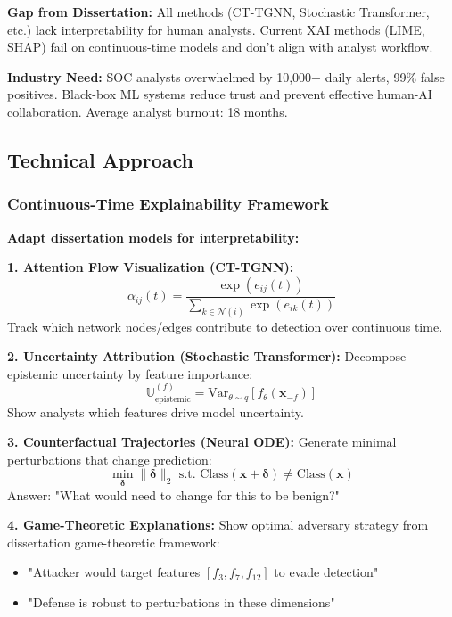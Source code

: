 \documentclass[11pt,letterpaper]{article}
\begin{document}
\textbf{Gap from Dissertation:} All methods (CT-TGNN, Stochastic Transformer, etc.) lack interpretability for human analysts. Current XAI methods (LIME, SHAP) fail on continuous-time models and don't align with analyst workflow.

\textbf{Industry Need:} SOC analysts overwhelmed by 10,000+ daily alerts, 99\% false positives. Black-box ML systems reduce trust and prevent effective human-AI collaboration. Average analyst burnout: 18 months.

\subsection{Technical Approach}

\subsubsection{Continuous-Time Explainability Framework}

\textbf{Adapt dissertation models for interpretability:}

\textbf{1. Attention Flow Visualization (CT-TGNN):}
\begin{equation}
\alpha_{ij}(t) = \frac{\exp(e_{ij}(t))}{\sum_{k \in \mathcal{N}(i)} \exp(e_{ik}(t))}
\end{equation}
Track which network nodes/edges contribute to detection over continuous time.

\textbf{2. Uncertainty Attribution (Stochastic Transformer):}
Decompose epistemic uncertainty by feature importance:
\begin{equation}
\mathbb{U}_{\text{epistemic}}^{(f)} = \text{Var}_{\theta \sim q}[f_\theta(\mathbf{x}_{-f})]
\end{equation}
Show analysts which features drive model uncertainty.

\textbf{3. Counterfactual Trajectories (Neural ODE):}
Generate minimal perturbations that change prediction:
\begin{equation}
\min_{\boldsymbol{\delta}} \|\boldsymbol{\delta}\|_2 \text{ s.t. } \text{Class}(\mathbf{x} + \boldsymbol{\delta}) \neq \text{Class}(\mathbf{x})
\end{equation}
Answer: "What would need to change for this to be benign?"

\textbf{4. Game-Theoretic Explanations:}
Show optimal adversary strategy from dissertation game-theoretic framework:
\begin{itemize}
\item "Attacker would target features $[f_3, f_7, f_{12}]$ to evade detection"
\item "Defense is robust to perturbations in these dimensions"
\end{itemize}
\end{document}
